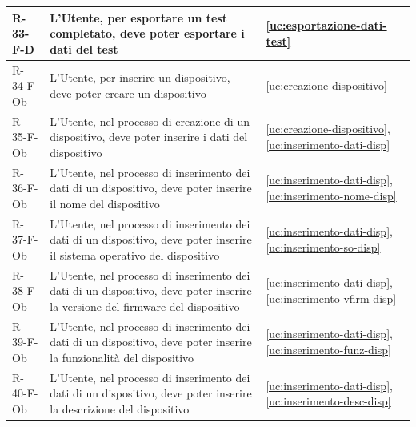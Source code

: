 ﻿\documentclass[a4paper,12pt]{article}
\begin{document}
{{\begin{longtable}{|l|p{}|p{}|}
            R-33-F-D        & L'Utente, per esportare un test completato, deve poter esportare i dati del test   & \ref{uc:esportazione-dati-test}                                               \\ \hline
            R-34-F-Ob       & L'Utente, per inserire un dispositivo, deve poter creare un dispositivo                                                                                                                     & \ref{uc:creazione-dispositivo}                                               \\ \hline
            R-35-F-Ob       & L'Utente, nel processo di creazione di un dispositivo, deve poter inserire i dati del dispositivo                                                                                           & \ref{uc:creazione-dispositivo}, \ref{uc:inserimento-dati-disp}                 \\ \hline
            R-36-F-Ob       & L'Utente, nel processo di inserimento dei dati di un dispositivo, deve poter inserire il nome del dispositivo                                                                               & \ref{uc:inserimento-dati-disp}, \ref{uc:inserimento-nome-disp}         \\ \hline
            R-37-F-Ob       & L'Utente, nel processo di inserimento dei dati di un dispositivo, deve poter inserire il sistema operativo del dispositivo                                                                  & \ref{uc:inserimento-dati-disp}, \ref{uc:inserimento-so-disp}         \\ \hline
            R-38-F-Ob       & L'Utente, nel processo di inserimento dei dati di un dispositivo, deve poter inserire la versione del firmware del dispositivo                                                              & \ref{uc:inserimento-dati-disp}, \ref{uc:inserimento-vfirm-disp}         \\ \hline
            R-39-F-Ob       & L'Utente, nel processo di inserimento dei dati di un dispositivo, deve poter inserire la funzionalità del dispositivo                                                                       & \ref{uc:inserimento-dati-disp}, \ref{uc:inserimento-funz-disp}         \\ \hline
            R-40-F-Ob       & L'Utente, nel processo di inserimento dei dati di un dispositivo, deve poter inserire la descrizione del dispositivo                                                                        & \ref{uc:inserimento-dati-disp}, \ref{uc:inserimento-desc-disp}         \\ \hline

\end{longtable}}}
\end{document}
